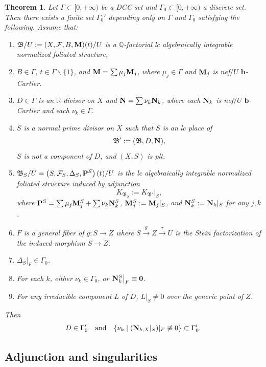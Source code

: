 \documentclass[11pt,reqno]{amsart}
\numberwithin{equation}{section}
\newcommand{\bb}{\bm{b}}
\newcommand{\Mm}{{\bf{M}}}
\newcommand{\Nn}{{\bf{N}}}
\newcommand{\Pp}{{\bf{P}}}
\newcommand{\Rr}{\mathbb{R}}
\newcommand{\Bb}{{\mathfrak{B}}}
\newcommand{\Ff}{\mathcal{F}}
\newcommand{\Ii}{\Gamma}
\newtheorem{thm}{Theorem}[section]
\theoremstyle{definition}
\begin{document}
\begin{thm}\label{thm: finite inversion of adjunction to finite 2}
 Let $\Ii\subset [0,+\infty)$ be a DCC set and $\Ii_0\subset [0,+\infty)$ a discrete set. Then there exists a finite set $\Ii_0'$ depending only on $\Ii$ and $\Ii_0$ satisfying the following. Assume that:
\begin{enumerate}
\item $\Bb/U:=(X,\Ff,B,\Mm)(t)/U$ is a $\mathbb Q$-factorial lc algebraically integrable normalized foliated structure,
\item $B\in\Ii$, $t\in\Ii\backslash\{1\}$, and $\Mm=\sum \mu_j\Mm_j$, where $\mu_j\in\Ii$ and $\Mm_j$ is nef$/U$ $\bb$-Cartier.
\item $D\in\Ii$ is an $\Rr$-divisor on $X$ and $\Nn=\sum\nu_k\Nn_k$, where each $\Nn_k$ is nef$/U$ $\bb$-Cartier and each $\nu_k\in\Ii$.
\item $S$ is a normal prime divisor on $X$ such that $S$ is an lc place of 
$$\Bb':=(\Bb,D,\Nn),$$
$S$ is not a component of $D$, and $(X,S)$ is plt.
\item $\Bb_S/U=\left(S,\Ff_S,\Delta_S,\Pp^S\right)(t)/U$ is the lc algebraically integrable normalized foliated structure induced by adjunction
$$K_{\Bb_S}:=K_{\Bb'}|_S,$$
where $\Pp^S=\sum \mu_j\Mm_j^S+\sum\nu_k\Nn_k^S$, $\Mm_j^S :=\Mm_j|_S$, and $\Nn_k^S :=\Nn_k|_S$ for any $j,k$.
\item $F$ is a general fiber of $g: S\rightarrow Z$ where $S\xrightarrow{g} Z\xrightarrow{\tau} U$ is the Stein factorization of the induced morphism $S\rightarrow Z$.
\item $\Delta_S|_F\in\Ii_0$.
\item For each $k$, either $\nu_k\in\Ii_0$, or $\Nn_{k}^S\big|_F\equiv\bm{0}$.
\item For any irreducible component $L$ of $D$, $L|_S\neq0$ over the generic point of $Z$.
\end{enumerate}
Then 
$$D\in\Ii_0'\quad \text{and} \quad \{\nu_k\mid (\Nn_{k,X}|_S)|_F\not\equiv 0\}\subset\Ii_0'.$$
\end{thm}

\subsection{Adjunction and singularities}
\end{document}
